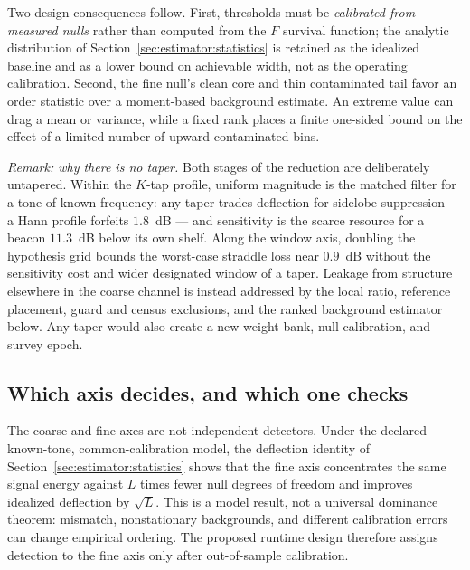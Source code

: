 Two design consequences follow. First, thresholds must be \emph{calibrated from measured nulls} rather than computed from the $F$ survival function; the analytic distribution of Section~\ref{sec:estimator:statistics} is retained as the idealized baseline and as a lower bound on achievable width, not as the operating calibration. Second, the fine null's clean core and thin contaminated tail favor an order statistic over a moment-based background estimate. An extreme value can drag a mean or variance, while a fixed rank places a finite one-sided bound on the effect of a limited number of upward-contaminated bins.

\textit{Remark: why there is no taper.} Both stages of the reduction are deliberately untapered. Within the $K$-tap profile, uniform magnitude is the matched filter for a tone of known frequency: any taper trades deflection for sidelobe suppression --- a Hann profile forfeits $1.8$~dB --- and sensitivity is the scarce resource for a beacon $11.3$~dB below its own shelf. Along the window axis, doubling the hypothesis grid bounds the worst-case straddle loss near $0.9$~dB without the sensitivity cost and wider designated window of a taper. Leakage from structure elsewhere in the coarse channel is instead addressed by the local ratio, reference placement, guard and census exclusions, and the ranked background estimator below. Any taper would also create a new weight bank, null calibration, and survey epoch.

\subsection*{Which axis decides, and which one checks}

The coarse and fine axes are not independent detectors. Under the declared known-tone, common-calibration model, the deflection identity of Section~\ref{sec:estimator:statistics} shows that the fine axis concentrates the same signal energy against $L$ times fewer null degrees of freedom and improves idealized deflection by $\sqrt{L}$. This is a model result, not a universal dominance theorem: mismatch, nonstationary backgrounds, and different calibration errors can change empirical ordering. The proposed runtime design therefore assigns detection to the fine axis only after out-of-sample calibration.

